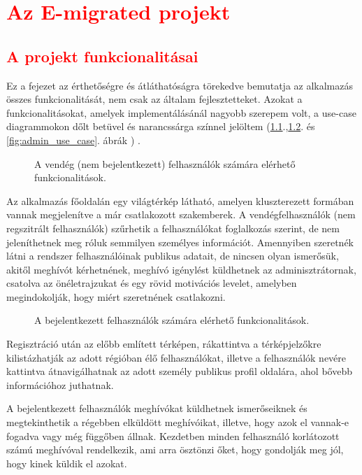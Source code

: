 \chapter{\textcolor{red}{Az E-migrated projekt}}\label{ch:projektrol}

\section{\textcolor{red}{A projekt funkcionalitásai}}\label{sec:projektrol:funkcionalitasok}

Ez a fejezet az érthetőségre és átláthatóságra törekedve bemutatja az alkalmazás összes funkcionalitását, nem csak az általam fejlesztetteket. Azokat a funkcionalitásokat, amelyek implementálásánál nagyobb szerepem volt, a use-case diagrammokon dőlt betüvel és narancssárga színnel jelöltem (\ref{fig:vendeg_use_case}.,\ref{fig:felhasznalo_user_case}. és \ref{fig:admin_use_case}. ábrák ) . 

\begin{figure}
  \centering
  \caption{A vendég (nem bejelentkezett) felhasználók számára elérhető funkcionalitások.}
  \label{fig:vendeg_use_case}
\end{figure}
Az alkalmazás főoldalán egy világtérkép  látható, amelyen kluszterezett formában vannak megjelenítve a már csatlakozott szakemberek. A vendégfelhasználók (nem regszitrált felhasználók) szűrhetik a felhasználókat foglalkozás szerint, de nem jeleníthetnek meg róluk semmilyen személyes információt. Amennyiben szeretnék látni a rendszer felhasználóinak publikus adatait, de nincsen olyan ismerősük, akitől meghívót kérhetnének, meghívó igénylést küldhetnek az adminisztrátornak, csatolva az önéletrajzukat és egy rövid motivációs levelet, amelyben megindokolják, hogy miért szeretnének csatlakozni.

\begin{figure}
  \centering
  \caption{A bejelentkezett felhasználók számára elérhető funkcionalitások.}
  \label{fig:felhasznalo_user_case}
\end{figure}

Regisztráció után az előbb említett térképen, rákattintva a térképjelzőkre kilistázhatják az adott régióban élő felhasználókat, illetve a felhasználók nevére kattintva átnavigálhatnak az adott személy publikus profil oldalára, ahol bővebb információhoz juthatnak. 

A bejelentkezett felhasználók meghívókat küldhetnek ismerőseiknek és megtekinthetik a régebben elküldött meghívóikat, illetve, hogy azok el vannak-e fogadva vagy még függőben állnak. Kezdetben minden felhasználó korlátozott számú meghívóval rendelkezik, ami arra ösztönzi őket, hogy gondolják meg jól, hogy kinek küldik el azokat.

